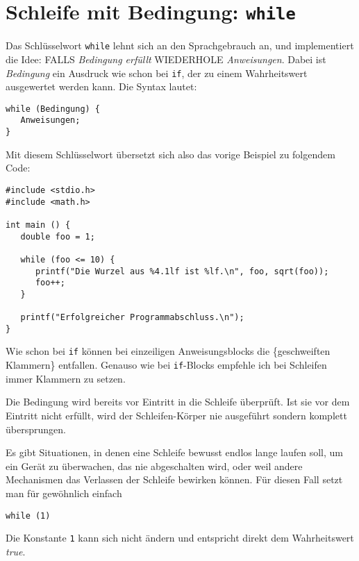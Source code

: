 \section{Schleife mit Bedingung: \texttt{while}}
Das Schlüsselwort \texttt{while} lehnt sich an den Sprachgebrauch an, und implementiert die Idee: FALLS \emph{Bedingung erfüllt} WIEDERHOLE \emph{Anweisungen}. Dabei ist \emph{Bedingung} ein Ausdruck wie schon bei \texttt{if}, der zu einem Wahrheitswert ausgewertet werden kann. Die Syntax lautet:

\begin{codebox}
\begin{verbatim}
while (Bedingung) {
   Anweisungen;
}
\end{verbatim}
\end{codebox}

Mit diesem Schlüsselwort übersetzt sich also das vorige Beispiel zu folgendem Code:

\begin{codebox}
\begin{verbatim}
#include <stdio.h>
#include <math.h>

int main () {
   double foo = 1;

   while (foo <= 10) {
      printf("Die Wurzel aus %4.1lf ist %lf.\n", foo, sqrt(foo));
      foo++;
   }

   printf("Erfolgreicher Programmabschluss.\n");
}
\end{verbatim}
\end{codebox}

Wie schon bei \texttt{if} können bei einzeiligen Anweisungsblocks die \{geschweiften Klammern\} entfallen. Genauso wie bei \texttt{if}-Blocks empfehle ich bei Schleifen immer Klammern zu setzen.

Die Bedingung wird bereits vor Eintritt in die Schleife überprüft. Ist sie vor dem Eintritt nicht erfüllt, wird der Schleifen-Körper nie ausgeführt sondern komplett übersprungen.

\begin{hintbox}
Es gibt Situationen, in denen eine Schleife bewusst endlos lange laufen soll, \eg um ein Gerät zu überwachen, das nie abgeschalten wird, oder weil andere Mechanismen das Verlassen der Schleife bewirken können. Für diesen Fall setzt man für gewöhnlich einfach
\begin{center}
\texttt{while (1)}
\end{center}
Die Konstante \texttt{1} kann sich nicht ändern und entspricht direkt dem Wahrheitswert \emph{true}.
\end{hintbox}

